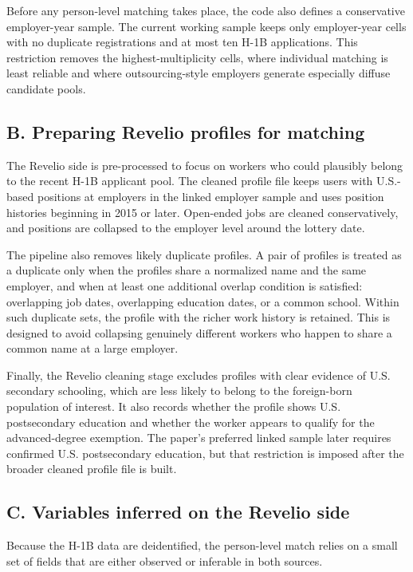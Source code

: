 Before any person-level matching takes place, the code also defines a conservative employer-year sample. The current working sample keeps only employer-year cells with no duplicate registrations and at most ten H-1B applications. This restriction removes the highest-multiplicity cells, where individual matching is least reliable and where outsourcing-style employers generate especially diffuse candidate pools.

\subsection{B. Preparing Revelio profiles for matching}

The Revelio side is pre-processed to focus on workers who could plausibly belong to the recent H-1B applicant pool. The cleaned profile file keeps users with U.S.-based positions at employers in the linked employer sample and uses position histories beginning in 2015 or later. Open-ended jobs are cleaned conservatively, and positions are collapsed to the employer level around the lottery date.

The pipeline also removes likely duplicate profiles. A pair of profiles is treated as a duplicate only when the profiles share a normalized name and the same employer, and when at least one additional overlap condition is satisfied: overlapping job dates, overlapping education dates, or a common school. Within such duplicate sets, the profile with the richer work history is retained. This is designed to avoid collapsing genuinely different workers who happen to share a common name at a large employer.

Finally, the Revelio cleaning stage excludes profiles with clear evidence of U.S. secondary schooling, which are less likely to belong to the foreign-born population of interest. It also records whether the profile shows U.S. postsecondary education and whether the worker appears to qualify for the advanced-degree exemption. The paper's preferred linked sample later requires confirmed U.S. postsecondary education, but that restriction is imposed after the broader cleaned profile file is built.

\subsection{C. Variables inferred on the Revelio side}

Because the H-1B data are deidentified, the person-level match relies on a small set of fields that are either observed or inferable in both sources.

